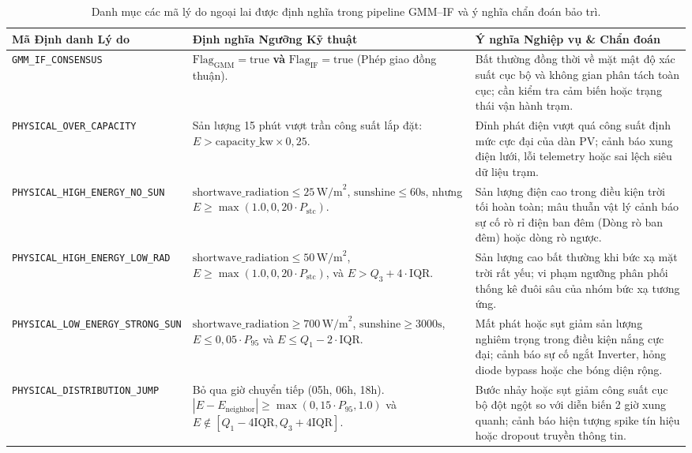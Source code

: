 \documentclass[12pt, a4paper]{report}
\begin{document}
\begin{table}[H]
\centering
\small
\renewcommand{\arraystretch}{1.3}
\begin{tabularx}{\textwidth}{@{} l p{4.5cm} X @{}}
\toprule
\textbf{Mã Định danh Lý do} & \textbf{Định nghĩa Ngưỡng Kỹ thuật} & \textbf{Ý nghĩa Nghiệp vụ \& Chẩn đoán} \\
\midrule
\texttt{GMM\_IF\_CONSENSUS} & 
$\text{Flag}_{\text{GMM}} = \text{true}$ \textbf{và} $\text{Flag}_{\text{IF}} = \text{true}$ (Phép giao đồng thuận). & 
Bất thường đồng thời về mặt mật độ xác suất cục bộ và không gian phân tách toàn cục; cần kiểm tra cảm biến hoặc trạng thái vận hành trạm. \\
\midrule
\texttt{PHYSICAL\_OVER\_CAPACITY} & 
Sản lượng 15 phút vượt trần công suất lắp đặt: $E > \text{capacity\_kw} \times 0{,}25$. & 
Đỉnh phát điện vượt quá công suất định mức cực đại của dàn PV; cảnh báo xung điện lưới, lỗi telemetry hoặc sai lệch siêu dữ liệu trạm. \\
\midrule
\texttt{PHYSICAL\_HIGH\_ENERGY\_NO\_SUN} & 
$\text{shortwave\_radiation} \le 25 \, \text{W/m}^2$, $\text{sunshine} \le 60\text{s}$, nhưng $E \ge \max(1.0, 0{,}20 \cdot P_{\text{stc}})$. & 
Sản lượng điện cao trong điều kiện trời tối hoàn toàn; mâu thuẫn vật lý cảnh báo sự cố rò rỉ điện ban đêm (Dòng rò ban đêm) hoặc dòng rò ngược. \\
\midrule
\texttt{PHYSICAL\_HIGH\_ENERGY\_LOW\_RAD} & 
$\text{shortwave\_radiation} \le 50 \, \text{W/m}^2$, $E \ge \max(1.0, 0{,}20 \cdot P_{\text{stc}})$, và $E > Q_3 + 4 \cdot \text{IQR}$. & 
Sản lượng cao bất thường khi bức xạ mặt trời rất yếu; vi phạm ngưỡng phân phối thống kê đuôi sâu của nhóm bức xạ tương ứng. \\
\midrule
\texttt{PHYSICAL\_LOW\_ENERGY\_STRONG\_SUN} & 
$\text{shortwave\_radiation} \ge 700 \, \text{W/m}^2$, $\text{sunshine} \ge 3000\text{s}$, $E \le 0{,}05 \cdot P_{95}$ và $E \le Q_1 - 2 \cdot \text{IQR}$. & 
Mất phát hoặc sụt giảm sản lượng nghiêm trọng trong điều kiện nắng cực đại; cảnh báo sự cố ngắt Inverter, hỏng diode bypass hoặc che bóng diện rộng. \\
\midrule
\texttt{PHYSICAL\_DISTRIBUTION\_JUMP} & 
Bỏ qua giờ chuyển tiếp (05h, 06h, 18h). $|E - E_{\text{neighbor}}| \ge \max(0{,}15 \cdot P_{95}, 1.0)$ và $E \notin [Q_1 - 4\text{IQR}, Q_3 + 4\text{IQR}]$. & 
Bước nhảy hoặc sụt giảm công suất cục bộ đột ngột so với diễn biến 2 giờ xung quanh; cảnh báo hiện tượng spike tín hiệu hoặc dropout truyền thông tin. \\
\bottomrule
\end{tabularx}
\caption{Danh mục các mã lý do ngoại lai được định nghĩa trong pipeline GMM--IF và ý nghĩa chẩn đoán bảo trì.}
\label{tab:outlier_reasons_dict}
\end{table}
\end{document}
